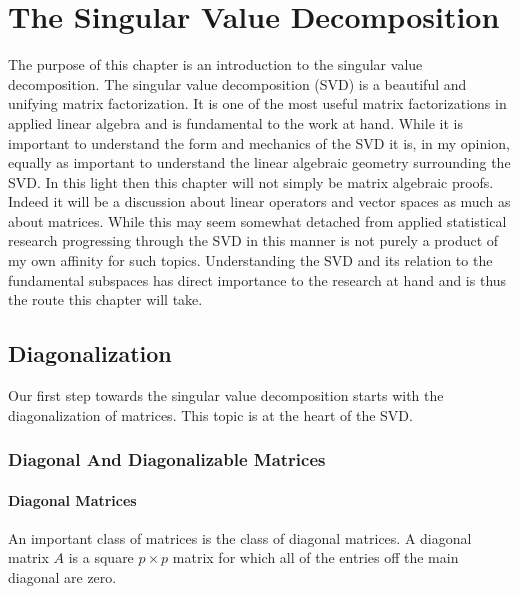\documentclass{book}
\begin{document}
\chapter{The Singular Value Decomposition}

The purpose of this chapter is an introduction to the singular value decomposition. The singular value decomposition (SVD) is a beautiful and unifying matrix factorization. It is one of the most useful matrix factorizations in applied linear algebra and is fundamental to the work at hand. While it is important to understand the form and mechanics of the SVD it is, in my opinion, equally as important to understand the linear algebraic geometry surrounding the SVD. In this light then this chapter will not simply be matrix algebraic proofs. Indeed it will be a discussion about linear operators and vector spaces as much as about matrices. While this may seem somewhat detached from applied statistical research progressing through the SVD in this manner is not purely a product of my own affinity for such topics. Understanding the SVD and its relation to the fundamental subspaces has direct importance to the research at hand and is thus the route this chapter will take.


\section{Diagonalization}

Our first step towards the singular value decomposition starts with the diagonalization of matrices. This topic is at the heart of the SVD. 

\subsection{Diagonal And Diagonalizable Matrices}

\subsubsection{Diagonal Matrices} An important class of matrices is the class of diagonal matrices. A diagonal matrix $A$ is a square $p \times p$ matrix for which all of the entries off the main diagonal are zero.
\end{document}
